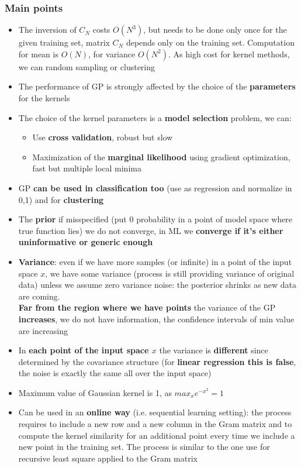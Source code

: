     \subsubsection{Main points}
    \begin{itemize}
        \item The inversion of $C_N$ costs $O(N^3)$, but needs to be done only once for the given training set, matrix $C_N$ depends only on the training set. Computation for mean is $O(N)$, for variance $O(N^2)$. As high cost for kernel methods, we can random sampling or clustering
        \item The performance of GP is strongly affected by the choice of the \textbf{parameters} for the kernels
        \item The choice of the kernel parameters is a \textbf{model selection} problem, we can:
        \begin{itemize}
            \item Use \textbf{cross validation}, robust but slow
            \item Maximization of the \textbf{marginal likelihood} using gradient optimization, fast but multiple local minima
        \end{itemize}
        \item GP \textbf{can be used in classification too} (use as regression and normalize in 0,1) and for \textbf{clustering}
        \item The \textbf{prior} if misspecified (put 0 probability in a point of model space where true function lies) we do not converge, in ML we \textbf{converge if it's either uninformative or generic enough}
        \item \textbf{Variance}: even if we have more samples (or infinite) in a point of the input space $x$, we have some variance (process is still providing variance of original data) unless we assume zero variance noise: the posterior shrinks as new data are coming.\\
        \textbf{Far from the region where we have points} the variance of the GP \textbf{increases}, we do not have information, the confidence intervals of min value are increasing
        \item In \textbf{each point of the input space $x$} the variance is \textbf{different} since determined by the covariance structure (for \textbf{linear regression this is false}, the noise is exactly the same all over the input space)
        \item Maximum value of Gaussian kernel is 1, as $max_xe^{-x^2}=1$
        \item Can be used in an \textbf{online way} (i.e. sequential learning setting): the process requires to include a new row and a new column in the Gram matrix and to compute the kernel similarity for an additional point every time we include a new point in the training set. The process is similar to the one use for recursive least square applied to the Gram matrix
    \end{itemize}